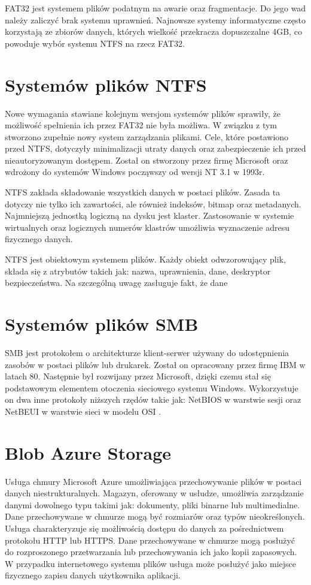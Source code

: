 FAT32 jest systemem plików podatnym na awarie oraz fragmentacje. Do jego wad należy zaliczyć brak systemu uprawnień. Najnowsze systemy informatyczne często korzystają ze zbiorów danych, których wielkość przekracza dopuszczalne 4GB, co powoduje wybór systemu NTFS na rzecz FAT32. 
\section{Systemów plików NTFS}
Nowe wymagania stawiane kolejnym wersjom systemów plików sprawiły, że możliwość spełnienia ich przez FAT32 nie była możliwa. W związku z tym stworzono zupełnie nowy system zarządzania plikami. Cele, które postawiono przed NTFS, dotyczyły minimalizacji utraty danych oraz zabezpieczenie ich przed nieautoryzowanym dostępem. Został on stworzony przez firmę Microsoft oraz wdrożony do systemów Windows począwszy od wersji NT 3.1 w 1993r.

NTFS zakłada składowanie wszystkich danych w postaci plików. Zasada ta dotyczy nie tylko ich zawartości, ale również indeksów, bitmap oraz metadanych. Najmniejszą jednostką logiczną na dysku jest klaster. Zastosowanie w systemie wirtualnych oraz logicznych numerów klastrów umożliwia wyznaczenie adresu fizycznego danych.

NTFS jest obiektowym systemem plików. Każdy obiekt odwzorowujący plik, składa się z atrybutów takich jak: nazwa, uprawnienia, dane, deskryptor bezpieczeństwa. Na szczególną uwagę zasługuje fakt, że dane 


\section{Systemów plików SMB}
SMB\cite{SMB:limitation} jest protokołem o architekturze klient-serwer używany do udostępnienia zasobów w postaci plików lub drukarek. Został on opracowany przez firmę IBM w latach 80. Następnie był rozwijany przez Microsoft, dzięki czemu stał się podstawowym elementem otoczenia sieciowego systemu Windows. Wykorzystuje on dwa inne protokoły niższych rzędów takie jak: NetBIOS w warstwie sesji oraz NetBEUI w warstwie sieci w modelu OSI \cite{ISOOSI:limitation}. 
\section{Blob Azure Storage}
Usługa chmury Microsoft Azure\cite{BlobAzureTutorial:limitation} umożliwiająca przechowywanie plików w postaci danych niestrukturalnych. Magazyn, oferowany w usłudze, umożliwia zarządzanie danymi dowolnego typu takimi jak: dokumenty, pliki binarne lub multimedialne. Dane przechowywane w chmurze mogą być rozmiarów oraz typów nieokreślonych. Usługa charakteryzuje się możliwością dostępu do danych za pośrednictwem protokołu HTTP lub HTTPS. Dane przechowywane w chmurze mogą posłużyć do rozproszonego przetwarzania lub przechowywania ich jako kopii zapasowych. W przypadku internetowego systemu plików usługa może posłużyć jako miejsce fizycznego zapisu danych użytkownika aplikacji.